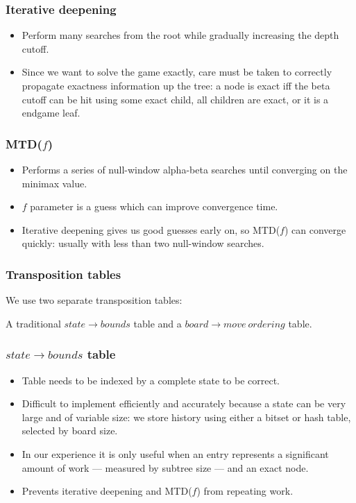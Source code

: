 \documentclass{beamer}
\begin{document}
    \begin{frame}
        \frametitle{Iterative deepening}
        \begin{itemize}
            \item Perform many searches from the root while gradually increasing the depth cutoff.
            \item Since we want to solve the game exactly, care must be taken to correctly propagate exactness
                information up the tree: a node is exact iff the beta cutoff can be hit using some exact child,
                all children are exact, or it is a endgame leaf.
        \end{itemize}
    \end{frame}

    \begin{frame}
        \frametitle{MTD($f$)}
        \begin{itemize}
            \item Performs a series of null-window alpha-beta searches until converging on the minimax value.
            \item $f$ parameter is a guess which can improve convergence time.
            \item Iterative deepening gives us good guesses early on, so MTD($f$) can converge quickly:
                usually with less than two null-window searches.
        \end{itemize}
    \end{frame}

    \begin{frame}
        \frametitle{Transposition tables}
        We use two separate transposition tables:

        A traditional $state \rightarrow bounds$ table and
            a $board \rightarrow move\ ordering$ table.
    \end{frame}

    \begin{frame}
        \frametitle{$state \rightarrow bounds$ table}
        \begin{itemize}
            \item Table needs to be indexed by a complete state to be correct.
            \item Difficult to implement efficiently and accurately because a state can be very
                large and of variable size: we store history using either a bitset or hash table, selected by
                board size.
            \item In our experience it is only useful when an entry represents a significant amount
                of work --- measured by subtree size --- and an exact node.
            \item Prevents iterative deepening and MTD($f$) from repeating work.
        \end{itemize}
    \end{frame}
\end{document}
